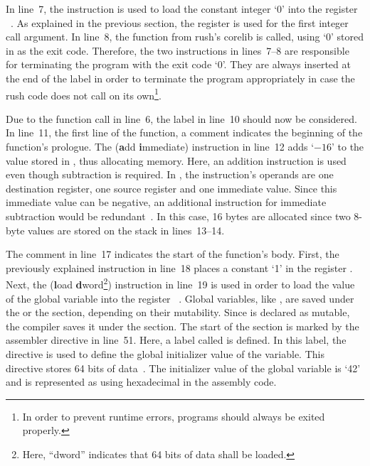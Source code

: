 In line~7, the  instruction is used to load the constant integer `0' into the register ~\cite[Reference Card]{Patterson2017}.
As explained in the previous section, the register  is used for the first integer call argument.
In line~8, the  function from rush's corelib is called, using `0' stored in  as the exit code.
Therefore, the two instructions in lines~7--8 are responsible for terminating the program with the exit code `0'.
They are always inserted at the end of the  label in order to terminate the program appropriately in case the rush code does not call  on its own\footnote{In order to prevent runtime errors, programs should always be exited properly.}.

Due to the function call in line~6, the  label in line~10 should now be considered.
In line~11, the first line of the  function, a comment indicates the beginning of the function's prologue.
The  (\textbf{a}dd \textbf{i}mmediate) instruction in line~12 adds `$-16$' to the value stored in , thus allocating memory.
Here, an addition instruction is used even though subtraction is required.
In \riscv{}, the  instruction's operands are one destination register, one source register and one immediate value.
Since this immediate value can be negative, an additional instruction for immediate subtraction would be redundant~\cite[Reference Card]{Patterson2017}.
In this case, 16 bytes are allocated since two 8-byte values are stored on the stack in lines~13--14.


The comment in line~17 indicates the start of the function's body.
First, the previously explained  instruction in line~18 places a constant `1' in the register .
Next, the  (\textbf{l}oad \textbf{d}word\footnote{Here, \enquote{dword} indicates that 64 bits of data shall be loaded.}) instruction in line~19 is used in order to load the value of the global variable  into the register ~\cite[Reference Card]{Patterson2017}.
Global variables, like , are saved under the  or the  section, depending on their mutability.
Since  is declared as mutable, the compiler saves it under the  section.
The start of the  section is marked by the  assembler directive in line~51.
Here, a label called  is defined.
In this label, the  directive is used to define the global initializer value of the variable.
This directive stores 64 bits of data~\cite[p.~39]{Patterson2017}.
The initializer value of the global variable is `42' and is represented as  using hexadecimal in the assembly code.

